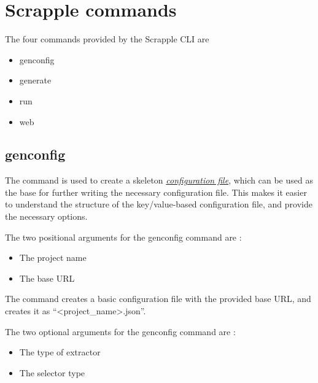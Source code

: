 \documentclass[letterpaper,12pt,english]{sphinxmanual}
\begin{document}
\section{Scrapple commands}
\label{framework/commands:scrapple-commands}\label{framework/commands::doc}\label{framework/commands:framework-commands}
The four commands provided by the Scrapple CLI are
\begin{itemize}
\item {} 
genconfig

\item {} 
generate

\item {} 
run

\item {} 
web

\end{itemize}


\subsection{genconfig}
\label{framework/commands:command-genconfig}\label{framework/commands:genconfig}
The  command is used to create a skeleton {\hyperref[framework/config:framework-config]{\emph{configuration file}}}, which can be used as the base for further writing the necessary configuration file. This makes it easier to understand the structure of the key/value-based configuration file, and provide the necessary options.

The two positional arguments for the genconfig command are :
\begin{itemize}
\item {} 
The project name

\item {} 
The base URL

\end{itemize}

The  command creates a basic configuration file with the provided base URL, and creates it as ``\textless{}project\_name\textgreater{}.json''.

The two optional arguments for the genconfig command are :
\begin{itemize}
\item {} 
The type of extractor

\item {} 
The selector type

\end{itemize}
\end{document}
